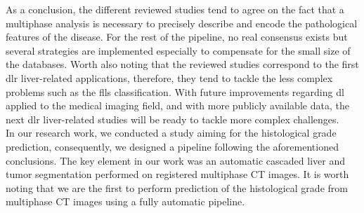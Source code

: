 As a conclusion, the different reviewed studies tend to agree on the
fact that a multiphase analysis is necessary to precisely describe and
encode the pathological features of the disease. For the rest of the
pipeline, no real consensus exists but several strategies are
implemented especially to compensate for the small size of the
databases. Worth also noting that the reviewed studies correspond to the
first \ac{dlr} liver-related applications, therefore, they tend to tackle the
less complex problems such as the \ac{fll}s classification. With future
improvements regarding \ac{dl} applied to the medical imaging field, and with
more publicly available data, the next \ac{dlr} liver-related studies will be
ready to tackle more complex challenges.\\
In our research work, we conducted a study aiming for the histological grade prediction, 
consequently, we designed a pipeline following the aforementioned conclusions. 
The key element in our work was an automatic cascaded liver and tumor segmentation performed on registered multiphase CT images. It is worth noting that we are the first to perform prediction of the histological grade from multiphase CT images using a fully automatic pipeline. 
